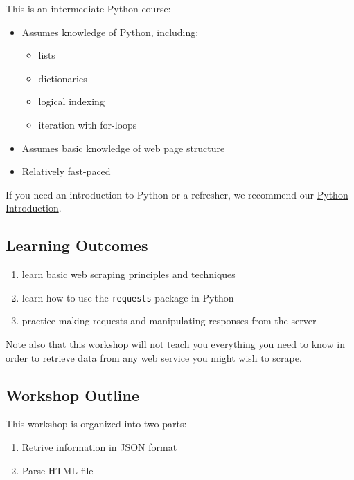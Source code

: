 \documentclass[]{book}
\providecommand{\tightlist}{%
  \setlength{\itemsep}{0pt}\setlength{\parskip}{0pt}}
\begin{document}
This is an intermediate Python course:

\begin{itemize}
\tightlist
\item
  Assumes knowledge of Python, including:

  \begin{itemize}
  \tightlist
  \item
    lists
  \item
    dictionaries
  \item
    logical indexing
  \item
    iteration with for-loops
  \end{itemize}
\item
  Assumes basic knowledge of web page structure
\item
  Relatively fast-paced
\end{itemize}

If you need an introduction to Python or a refresher, we recommend our
\href{https://iqss.github.io/dss-workshops/PythonIntro.html}{Python Introduction}.

\hypertarget{learning-outcomes-5}{%
\subsection{Learning Outcomes}\label{learning-outcomes-5}}

\begin{enumerate}
\def\labelenumi{\arabic{enumi}.}
\tightlist
\item
  learn basic web scraping principles and techniques
\item
  learn how to use the \texttt{requests} package in Python
\item
  practice making requests and manipulating responses from the server
\end{enumerate}

Note also that this workshop will not teach you everything you need to
know in order to retrieve data from any web service you might wish to
scrape.

\hypertarget{workshop-outline-4}{%
\subsection{Workshop Outline}\label{workshop-outline-4}}

This workshop is organized into two parts:

\begin{enumerate}
\def\labelenumi{\arabic{enumi}.}
\tightlist
\item
  Retrive information in JSON format
\item
  Parse HTML file
\end{enumerate}
\end{document}
